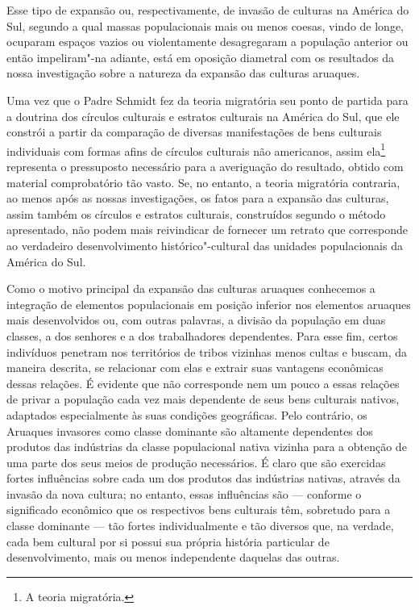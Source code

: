 Esse tipo de expansão ou, respectivamente, de invasão de culturas na
América do Sul, segundo a qual massas populacionais mais ou menos
coesas, vindo de longe, ocuparam espaços vazios ou violentamente
desagregaram a população anterior ou então impeliram"-na adiante, está em
oposição diametral com os resultados da nossa investigação sobre a
natureza da expansão das culturas aruaques.

Uma vez que o Padre Schmidt fez da teoria migratória seu ponto de
partida para a doutrina dos círculos culturais e estratos culturais na
América do Sul, que ele constrói a partir da comparação de diversas
manifestações de bens culturais individuais com formas afins de
círculos culturais não americanos, assim ela\footnote{A teoria migratória.}
representa o pressuposto necessário para a averiguação do resultado,
obtido com material comprobatório tão vasto. Se, no entanto, a teoria
migratória contraria, ao menos após as nossas investigações, os fatos
para a expansão das culturas, assim também os círculos e
estratos culturais, construídos segundo o método apresentado, não podem
mais reivindicar de fornecer um retrato que corresponde ao verdadeiro
desenvolvimento histórico"-cultural das unidades populacionais da América
do Sul.

Como o motivo principal da expansão das culturas aruaques conhecemos a
integração de elementos populacionais em posição inferior nos elementos
aruaques mais desenvolvidos ou, com outras palavras, a divisão da
população em duas classes, a dos senhores e a dos trabalhadores
dependentes. Para esse fim, certos indivíduos penetram nos territórios
de tribos vizinhas menos cultas e buscam, da maneira descrita, se
relacionar com elas e extrair suas vantagens econômicas dessas relações.
É evidente que não corresponde nem um pouco a essas relações de privar
a população cada vez mais dependente de seus bens culturais nativos,
adaptados especialmente às suas condições geográficas. Pelo contrário,
os Aruaques invasores como classe dominante são altamente dependentes
dos produtos das indústrias da classe populacional nativa vizinha para
a obtenção de uma parte dos seus meios de produção necessários. É claro
que são exercidas fortes influências sobre cada um dos produtos das
indústrias nativas, através da invasão da nova cultura; no entanto,
essas influências são --- conforme o significado econômico que os
respectivos bens culturais têm, sobretudo para a classe dominante --- tão
fortes individualmente e tão diversos que, na verdade, cada bem cultural
por si possui sua própria história particular de desenvolvimento, mais
ou menos independente daquelas das outras.

